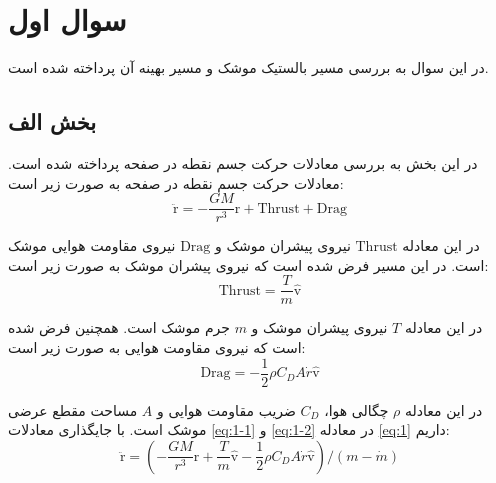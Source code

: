 \section{سوال اول}
در این سوال به بررسی مسیر بالستیک موشک و مسیر بهینه آن پرداخته شده است.
\subsection{بخش الف}
در این بخش به بررسی معادلات حرکت جسم نقطه در صفحه پرداخته شده است. معادلات حرکت جسم نقطه در صفحه به صورت زیر است:
\begin{equation}
    \label{eq:1}
    \ddot{\boldsymbol{\mathrm{r}}} = -\dfrac{GM}{r^3}\boldsymbol{\mathrm{r}} + \mathrm{Thrust} + \mathrm{Drag}
\end{equation}

در این معادله
$\mathrm{Thrust}$
نیروی پیشران موشک و
$\mathrm{Drag}$
نیروی مقاومت هوایی موشک است. در این مسیر فرض شده است که نیروی پیشران موشک به صورت زیر است:
\begin{equation}
    \label{eq:1-1}
    \mathrm{Thrust} = \dfrac{T}{m}\hat{\boldsymbol{\mathrm{v}}}
\end{equation}

در این معادله $T$ نیروی پیشران موشک و $m$ جرم موشک است. همچنین فرض شده است که نیروی مقاومت هوایی به صورت زیر است:
\begin{equation}
    \label{eq:1-2}
    \mathrm{Drag} = -\dfrac{1}{2}\rho C_D A \dot{r}\hat{\boldsymbol{\mathrm{v}}}
\end{equation}

در این معادله $\rho$ چگالی هوا، $C_D$ ضریب مقاومت هوایی و $A$ مساحت مقطع عرضی موشک است. با جایگذاری معادلات \eqref{eq:1-1} و \eqref{eq:1-2} در معادله \eqref{eq:1} داریم:
\begin{equation}
    \label{eq:1-4}
    \ddot{\boldsymbol{\mathrm{r}}} = \left(-\dfrac{GM}{r^3}\boldsymbol{\mathrm{r}} + \dfrac{T}{m}\hat{\boldsymbol{\mathrm{v}}} - \dfrac{1}{2}\rho C_D A \dot{r}\hat{\boldsymbol{\mathrm{v}}}\right)/(m-\dot{m})
\end{equation}


